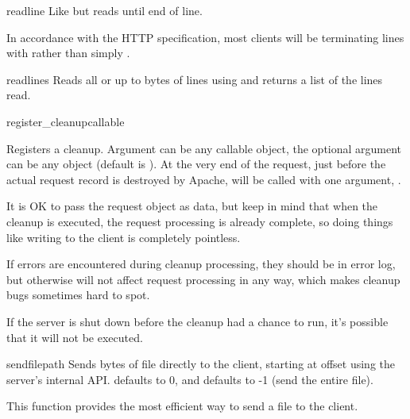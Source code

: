 \begin{methoddesc}[request]{readline}{}
  Like  but reads until end of line. 
  
  \begin{notice}
    In accordance with the HTTP specification, most clients will
    be terminating lines with  rather
    than simply .
  \end{notice}

\end{methoddesc}

\begin{methoddesc}[request]{readlines}{}
  Reads all or up to  bytes of lines using
   and returns a list of the lines read.
\end{methoddesc}

\begin{methoddesc}[request]{register_cleanup}{callable}

  Registers a cleanup. Argument  can be any callable
  object, the optional argument  can be any object (default is
  ). At the very end of the request, just before the actual
  request record is destroyed by Apache,  will be called
  with one argument, .

  It is OK to pass the request object as data, but keep in mind that
  when the cleanup is executed, the request processing is already
  complete, so doing things like writing to the client is completely
  pointless. 

  If errors are encountered during cleanup processing, they should be in
  error log, but otherwise will not affect request processing in any
  way, which makes cleanup bugs sometimes hard to spot.

  If the server is shut down before the cleanup had a chance to run,
  it's possible that it will not be executed.

\end{methoddesc}

\begin{methoddesc}[request]{sendfile}{path}
  Sends  bytes of file  directly to the client,
  starting at offset  using the server's internal
  API.  defaults to 0, and  defaults to -1 (send
  the entire file). 

  This function provides the most efficient way to send a file to the
  client.
\end{methoddesc}

